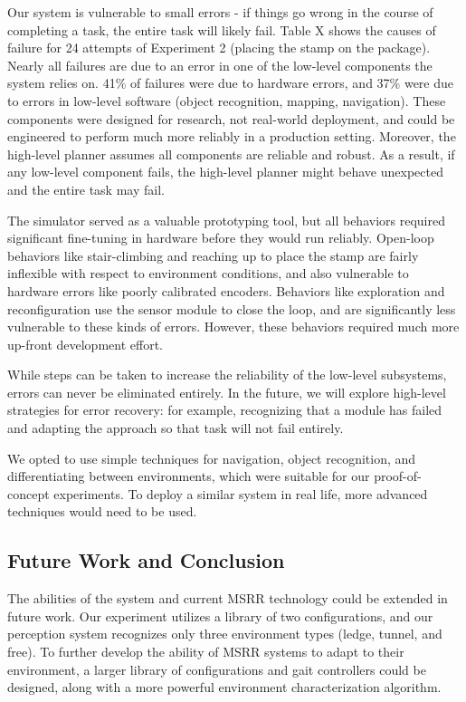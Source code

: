 \documentclass[conference]{IEEEtran}
\begin{document}
Our system is vulnerable to small errors - if things go wrong in the course of completing a task, the entire task will likely fail. 
Table X shows the causes of failure for 24 attempts of Experiment 2 (placing the stamp on the package).  
Nearly all failures are due to an error in one of the low-level components the system relies on. 
41\% of failures were due to hardware errors, and 37\% were due to errors in low-level software (object recognition, mapping, navigation). 
These components were designed for research, not real-world deployment, and could be engineered to perform much more reliably in a production setting. 
Moreover, the high-level planner assumes all components are reliable and robust. 
As a result, if any low-level component fails, the high-level planner might behave unexpected and the entire task may fail.

The simulator served as a valuable prototyping tool, but all behaviors required significant fine-tuning in hardware before they would run reliably.  
Open-loop behaviors like stair-climbing and reaching up to place the stamp are fairly inflexible with respect to environment conditions, and also vulnerable to hardware errors like poorly calibrated encoders.  
Behaviors like exploration and reconfiguration use the sensor module to close the loop, and are significantly less vulnerable to these kinds of errors.  
However, these behaviors required much more up-front development effort.

While steps can be taken to increase the reliability of the low-level subsystems, errors can never be eliminated entirely.  In the future, we will explore high-level strategies for error recovery: for example, recognizing that a module has failed and adapting the approach so that task will not fail entirely.

We opted to use simple techniques for navigation, object recognition, and differentiating between environments, which were suitable for our proof-of-concept experiments.  To deploy a similar system in real life, more advanced techniques would need to be used.
%
\subsection{Future Work and Conclusion}
%
The abilities of the system and current MSRR technology could be extended in future work.  Our experiment utilizes a library of two configurations, and our perception system recognizes only three environment types (ledge, tunnel, and free).  To further develop the ability of MSRR systems to adapt to their environment, a larger library of configurations and gait controllers could be designed, along with a more powerful environment characterization algorithm.
\end{document}

